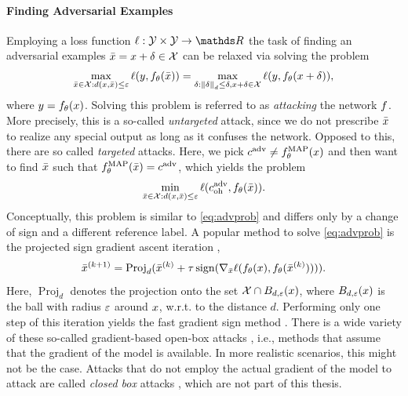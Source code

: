 \paragraph{Finding Adversarial Examples} Employing a loss function $\ell:\Oup\times\Oup\to\R$ the task of finding an adversarial examples $\bar{x}=x+\delta\in\mathcal{X}$ can be relaxed via solving the problem
%
\begin{align}\label{eq:advprob}
\max_{\bar{x}\in \mathcal{X}:d(x,\bar{x})\leq \varepsilon} \ell(y, f_\theta(\bar{x}))
=
\max_{\delta:\left\|\delta\right\|_d\leq\delta, x+\delta\in\mathcal{X}}
\ell(y, f_\theta(x+\delta)),
\end{align}
%
where $y=f_\theta(x)$. Solving this problem is referred to as \emph{attacking} the network $f$. More precisely, this is a so-called \emph{untargeted} attack, since we do not prescribe $\bar{x}$ to realize any special output as long as it confuses the network. Opposed to this, there are so called \emph{targeted} attacks. Here, we pick $c^{\operatorname{adv}} \neq f^{\operatorname{MAP}}_\theta(x)$ and then want to find $\bar{x}$ such that $f^{\operatorname{MAP}}_\theta(\bar{x}) = c^{\operatorname{adv}}$, which yields the problem
%
\begin{align*}
\min_{\bar{x}\in \mathcal{X}:d(x,\bar{x})\leq \varepsilon} \ell(c^{\operatorname{adv}}_{{\operatorname{oh}}}, f_\theta(\bar{x})).
\end{align*}
%
%
Conceptually, this problem is similar to \cref{eq:advprob} and differs only by a change of sign and a different reference label.
%
A popular method to solve \cref{eq:advprob} is the projected sign gradient ascent iteration \cite{kurakin2016adversarial},
%
\begin{align*}
\bar{x}^{(k+1)} = \operatorname{Proj}_d(\bar{x}^{(k)} + \tau \operatorname*{sign}(\nabla_{\bar{x}}
\ell(f_\theta(x), f_\theta(\bar{x}^{(k)})))).
\end{align*}
%
%
%
Here, $\operatorname{Proj}_d$ denotes the projection onto the set $\mathcal{X}\cap B_{d,\varepsilon}(x)$, where $B_{d,\varepsilon}(x)$ is the ball with radius $\varepsilon$ around $x$, w.r.t. to the distance $d$. Performing only one step of this iteration yields the fast gradient sign method \cite{goodfellow2014explaining}. There is a wide variety of these so-called gradient-based open-box attacks \cite{yuan2019adversarial}, i.e., methods that assume that the gradient of the model is available. In more realistic scenarios, this might not be the case. Attacks that do not employ the actual gradient of the model to attack are called \emph{closed box} attacks \cite{ilyas2018black}, which are not part of this thesis.
%
%
